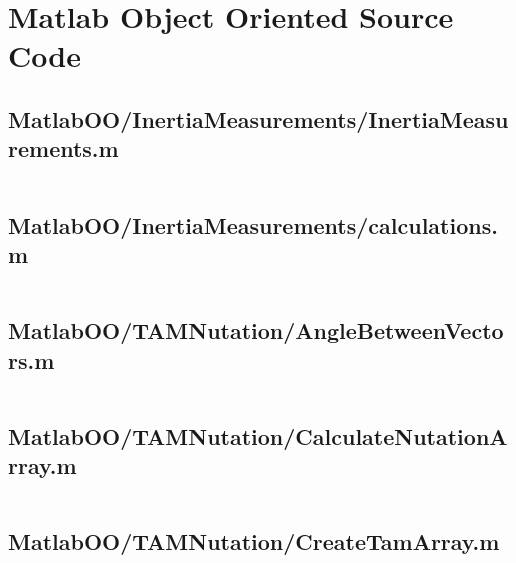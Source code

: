 
\chapter{Matlab Object Oriented Source Code}
\label{ch:MatlabObjectOrientedSourceCode}

\linespread{1}

\pagebreak
\section{MatlabOO/InertiaMeasurements/InertiaMeasurements.m}\label{code:MatlabOO/InertiaMeasurements/InertiaMeasurements.m}
\inputminted[linenos,fontsize=\scriptsize]{matlab}{/home/dcouture/git/mathyourlife/TSatPy/beta_versions/matlab_object_oriented/InertiaMeasurements/InertiaMeasurements.m}

\pagebreak
\section{MatlabOO/InertiaMeasurements/calculations.m}\label{code:MatlabOO/InertiaMeasurements/calculations.m}
\inputminted[linenos,fontsize=\scriptsize]{matlab}{/home/dcouture/git/mathyourlife/TSatPy/beta_versions/matlab_object_oriented/InertiaMeasurements/calculations.m}

\pagebreak
\section{MatlabOO/TAMNutation/AngleBetweenVectors.m}\label{code:MatlabOO/TAMNutation/AngleBetweenVectors.m}
\inputminted[linenos,fontsize=\scriptsize]{matlab}{/home/dcouture/git/mathyourlife/TSatPy/beta_versions/matlab_object_oriented/TAMNutation/AngleBetweenVectors.m}

\pagebreak
\section{MatlabOO/TAMNutation/CalculateNutationArray.m}\label{code:MatlabOO/TAMNutation/CalculateNutationArray.m}
\inputminted[linenos,fontsize=\scriptsize]{matlab}{/home/dcouture/git/mathyourlife/TSatPy/beta_versions/matlab_object_oriented/TAMNutation/CalculateNutationArray.m}

\pagebreak
\section{MatlabOO/TAMNutation/CreateTamArray.m}\label{code:MatlabOO/TAMNutation/CreateTamArray.m}
\inputminted[linenos,fontsize=\scriptsize]{matlab}{/home/dcouture/git/mathyourlife/TSatPy/beta_versions/matlab_object_oriented/TAMNutation/CreateTamArray.m}

